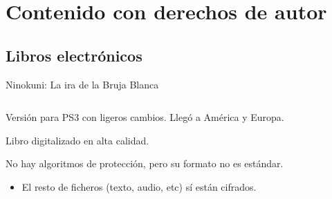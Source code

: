 
\section[Contenido con copyright]{Contenido con derechos de autor}
\subsection{Libros electrónicos}
\begin{frame}{Ninokuni: La ira de la Bruja Blanca}
\begin{columns}
    \begin{column}{0.65\textwidth}
    \begin{wideitemize}
        \item<1-> Versión para PS3 con ligeros cambios. Llegó a América y Europa.

        \item<2-> Libro digitalizado en alta calidad.

        \item<3-> No hay algoritmos de protección, pero su formato no es estándar.
        \begin{itemize}
            \item<4-> El resto de ficheros (texto, audio, etc) sí están cifrados.
        \end{itemize}
    \end{wideitemize}
    \end{column}


\end{columns}
\end{frame}

